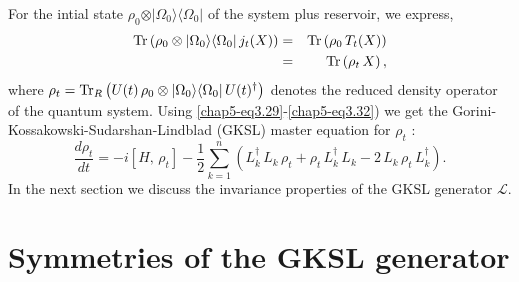 For the intial state $\rho_0\otimes \vert \Omega_0\rangle\langle\Omega_0\vert$ of the system plus reservoir, we express,
\begin{eqnarray}
{\rm Tr}\left(\rho_0\otimes \vert \Omega_0\rangle\langle\Omega_0\vert\, j_t(X)\right)&=& {\rm Tr}\left(\rho_0\, T_t(X)\right) \nonumber \\ 
&=& {\rm Tr}\left(\rho_t\, X\right), \label{chap5-eq3.32}
\end{eqnarray} 
where $\rho_t={\rm Tr}_R\left( U(t)\, \rho_0\otimes \vert \Omega_0\rangle\langle\Omega_0\vert\, U(t)^\dag\right)$ denotes the reduced density operator of the quantum system. Using \eqref{chap5-eq3.29}-\eqref{chap5-eq3.32}) we get the Gorini-Kossakowski-Sudarshan-Lindblad (GKSL) master equation for $\rho_t$ :
\begin{equation}
\frac{d \rho_t}{dt} = -i [ H,\,\rho_t]- \frac{1}{2} \sum_{k=1}^{n}\left(L^\dag_k\, L_k\, \rho_t + \rho_t\, L^\dag_k\, L_k -2\, L_k\, \rho_t\, L^\dag_k\right).  \label{chap5-eq3.33}
\end{equation}  
In the next section we discuss the invariance properties of the GKSL generator $\mathcal{L}$.   

\section{Symmetries of the GKSL generator} \label{chap5-sec4}

